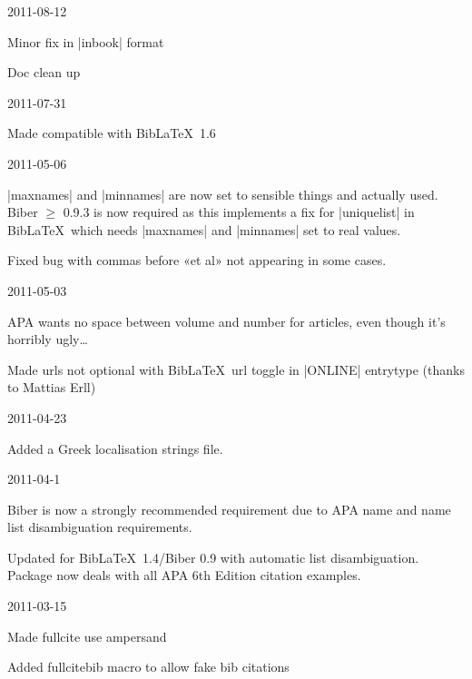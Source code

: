 \documentclass{ltxdockit}
\begin{document}
\begin{changelog}
\begin{release}{3.2}{2011-08-12}
\item Minor fix in |inbook| format
\item Doc clean up
\end{release}

\begin{release}{3.1}{2011-07-31}
\item Made compatible with Bib\LaTeX\ 1.6
\end{release}

\begin{release}{3.0}{2011-05-06}
\item |maxnames| and |minnames| are now set to sensible things and actually
  used. Biber $\geq$ 0.9.3 is now required as this implements a fix for
  |uniquelist| in Bib\LaTeX\ which needs |maxnames| and |minnames| set to
  real values.
\item Fixed bug with commas before «et al» not appearing in some cases.
\end{release}

\begin{release}{2.9}{2011-05-03}
\item APA wants no space between volume and number for articles, even though it's
  horribly ugly\ldots
\item Made urls not optional with Bib\LaTeX\ url toggle in |ONLINE| entrytype (thanks to Mattias Erll)
\end{release}

\begin{release}{2.8}{2011-04-23}
\item Added a Greek localisation strings file.
\end{release}

\begin{release}{2.7}{2011-04-1}
\item Biber is now a strongly recommended requirement due to APA name and
  name list disambiguation requirements.
\item Updated for Bib\LaTeX\ 1.4/Biber 0.9 with automatic list
  disambiguation. Package now deals with all APA 6th Edition citation examples.
\end{release}

\begin{release}{2.6}{2011-03-15}
\item Made fullcite use ampersand
\item Added fullcitebib macro to allow fake bib citations
\end{release}


\end{changelog}
\end{document}
